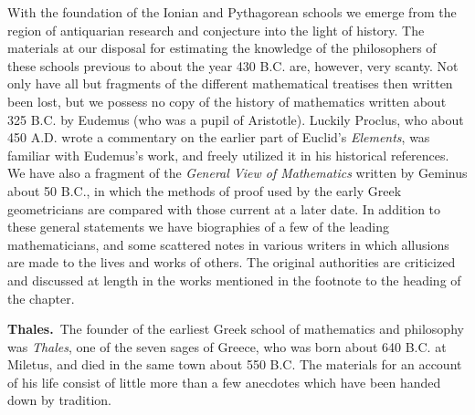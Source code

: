 \documentclass[12pt,oneside]{book}
\begin{document}
With the foundation of the Ionian and Pythagorean schools we emerge from the region of antiquarian research and conjecture into the light of history. The materials at our disposal for estimating the knowledge of the philosophers of these schools previous to about the year 430 B.C. are, however, very scanty. Not only have all but fragments of the different mathematical treatises then written been lost, but we possess no copy of the history of mathematics written about 325 B.C. by Eudemus (who was a pupil of Aristotle). Luckily Proclus, who about 450 A.D. wrote a commentary on the earlier part of Euclid's \textit{Elements}, was familiar with Eudemus's work, and freely utilized it in his historical references. We have also a fragment of the \textit{General View of Mathematics} written by Geminus about 50 B.C., in which the methods of proof used by the early Greek geometricians are compared with those current at a later date. In addition to these general statements we have biographies of a few of the leading mathematicians, and some scattered notes in various writers in which allusions are made to the lives and works of others. The original authorities are criticized and discussed at length in the works mentioned in the footnote to the heading of the chapter. \par 


\textbf{Thales.}\footnotemark\,  The founder of the earliest Greek school of mathematics and philosophy was \textit{Thales}, one of the seven sages of Greece, who was born about 640 B.C. at Miletus, and died in the same town about 550 B.C. The materials for an account of his life consist of little more than a few anecdotes which have been handed down by tradition. \par 
\end{document}
